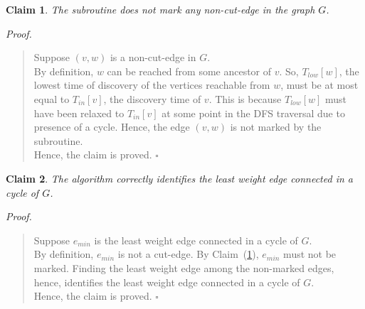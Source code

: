 \documentclass[12pt]{report}
\newtheorem{claim}{Claim}
\begin{document}
    \begin{claim}
        \label{claim:non-cut-edge}
        The subroutine does not mark any non-cut-edge in the graph $G$.
    \end{claim}
    \textit{Proof.}
    \begin{quote}
        Suppose $(v, w)$ is a non-cut-edge in $G$. \\
        By definition, $w$ can be reached from some ancestor of $v$.
        So, $T_{low}[w]$, the lowest time of discovery of the vertices reachable from $w$,
        must be at most equal to $T_{in}[v]$, the discovery time of $v$.
        This is because $T_{low}[w]$ must have been relaxed to $T_{in}[v]$ at some point in the DFS traversal due to presence of a cycle.
        Hence, the edge $(v, w)$ is not marked by the subroutine. \\
        Hence, the claim is proved. \hfill $\square$
    \end{quote}

    \begin{claim}
        The algorithm correctly identifies the least weight edge connected in a cycle of $G$.
    \end{claim}
    \textit{Proof.}
    \begin{quote}
        Suppose $e_{min}$ is the least weight edge connected in a cycle of $G$. \\
        By definition, $e_{min}$ is not a cut-edge.
        By Claim~(\ref{claim:non-cut-edge}), $e_{min}$ must not be marked.
        Finding the least weight edge among the non-marked edges, hence, identifies the least weight edge connected in a cycle of $G$. \\
        Hence, the claim is proved. \hfill $\square$
    \end{quote}

    \pagebreak
\end{document}
